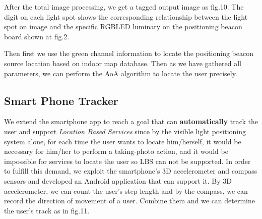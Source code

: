 \documentclass[conference]{IEEEtran}
\begin{document}
After the total image processing, we get a tagged output image as fig.10. The digit on each light spot shows the corresponding relationship between the light spot on image and the specific RGBLED luminary on the positioning beacon board shown at fig.2. 

Then first we use the green channel information to locate the positioning beacon source location based on indoor map database. Then as we have gathered all parameters, we can perform the AoA algorithm to locate the user precisely.

\begin{figure}
	\footnotesize
	\hspace{1cm}%
	
\end{figure}


\subsection{\textbf{Smart Phone Tracker}}
We extend the smartphone app to reach a goal that can \textbf{automatically} track the user and support \textit{Location Based Services} since by the visible light positioning system alone, for each time the user wants to locate him/herself, it would be necessary for him/her to perform a taking-photo action, and it would be impossible for services to locate the user so LBS can not be supported. In order to fulfill this demand, we exploit the smartphone's 3D accelerometer and compass sensors and developed an Android application that can support it. By 3D accelerometer, we can count the user's step length and by the compass, we can record the direction of movement of a user. Combine them and we can determine the user's track as in fig.11.
\end{document}

